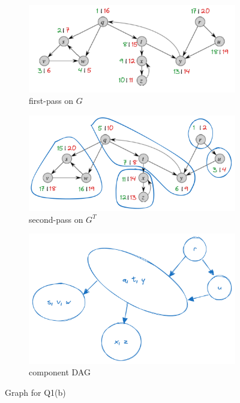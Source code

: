 \newpage
\begin{figure}[!ht]
    \centering
    \begin{subfigure}[b]{\textwidth}
         \centering
         \includegraphics[width=0.75\linewidth]{HWs//HW9//figures/1-2-1.png}
         \caption{first-pass on $G$}
         \label{fig:1-2-1}
    \end{subfigure}
    \begin{subfigure}[b]{\textwidth}
         \centering
         \includegraphics[width=0.75\linewidth]{HWs//HW9//figures/1-2-2.png}
         \caption{second-pass on $G^T$}
         \label{fig:1-2-2}
    \end{subfigure}
    \begin{subfigure}[b]{\textwidth}
         \centering
         \includegraphics[width=0.6\linewidth]{HWs//HW9//figures/1-2-3.png}
         \caption{component DAG}
         \label{fig:1-2-3}
    \end{subfigure}
    \caption{Graph for Q1(b)}
    \label{fig:Q1-b}
\end{figure}
